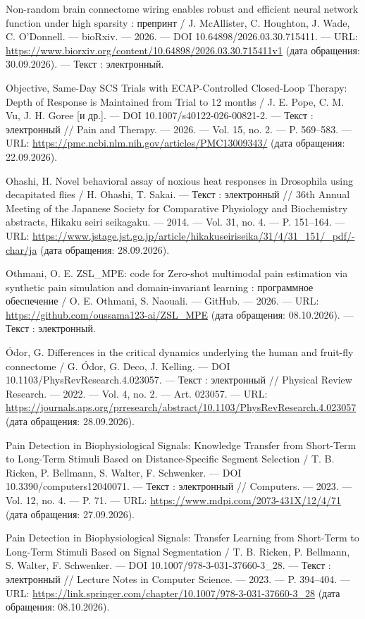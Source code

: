 \begin{list}{}{\setlength{\leftmargin}{10mm}\setlength{\labelwidth}{8mm}\setlength{\labelsep}{2mm}\setlength{\itemsep}{0pt}\setlength{\parsep}{0pt}\setlength{\topsep}{0pt}}
\item[213.] Non-random brain connectome wiring enables robust and efficient neural network function under high sparsity : препринт / J. McAllister, C. Houghton, J. Wade, C. O’Donnell. — bioRxiv. — 2026. — DOI 10.64898/2026.03.30.715411. — URL: \url{https://www.biorxiv.org/content/10.64898/2026.03.30.715411v1} (дата обращения: 30.09.2026). — Текст : электронный.
\item[214.] Objective, Same-Day SCS Trials with ECAP-Controlled Closed-Loop Therapy: Depth of Response is Maintained from Trial to 12 months / J. E. Pope, C. M. Vu, J. H. Goree [и др.]. — DOI 10.1007/s40122-026-00821-2. — Текст : электронный // Pain and Therapy. — 2026. — Vol. 15, no. 2. — P. 569–583. — URL: \url{https://pmc.ncbi.nlm.nih.gov/articles/PMC13009343/} (дата обращения: 22.09.2026).
\item[215.] Ohashi, H. Novel behavioral assay of noxious heat responses in Drosophila using decapitated flies / H. Ohashi, T. Sakai. — Текст : электронный // 36th Annual Meeting of the Japanese Society for Comparative Physiology and Biochemistry abstracts, Hikaku seiri seikagaku. — 2014. — Vol. 31, no. 4. — P. 151–164. — URL: \url{https://www.jstage.jst.go.jp/article/hikakuseiriseika/31/4/31\_151/\_pdf/-char/ja} (дата обращения: 28.09.2026).
\item[216.] Othmani, O. E. ZSL\_MPE: code for Zero-shot multimodal pain estimation via synthetic pain simulation and domain-invariant learning : программное обеспечение / O. E. Othmani, S. Naouali. — GitHub. — 2026. — URL: \url{https://github.com/oussama123-ai/ZSL\_MPE} (дата обращения: 08.10.2026). — Текст : электронный.
\item[217.] Ódor, G. Differences in the critical dynamics underlying the human and fruit-fly connectome / G. Ódor, G. Deco, J. Kelling. — DOI 10.1103/PhysRevResearch.4.023057. — Текст : электронный // Physical Review Research. — 2022. — Vol. 4, no. 2. — Art. 023057. — URL: \url{https://journals.aps.org/prresearch/abstract/10.1103/PhysRevResearch.4.023057} (дата обращения: 28.09.2026).
\item[218.] Pain Detection in Biophysiological Signals: Knowledge Transfer from Short-Term to Long-Term Stimuli Based on Distance-Specific Segment Selection / T. B. Ricken, P. Bellmann, S. Walter, F. Schwenker. — DOI 10.3390/computers12040071. — Текст : электронный // Computers. — 2023. — Vol. 12, no. 4. — P. 71. — URL: \url{https://www.mdpi.com/2073-431X/12/4/71} (дата обращения: 27.09.2026).
\item[219.] Pain Detection in Biophysiological Signals: Transfer Learning from Short-Term to Long-Term Stimuli Based on Signal Segmentation / T. B. Ricken, P. Bellmann, S. Walter, F. Schwenker. — DOI 10.1007/978-3-031-37660-3\_28. — Текст : электронный // Lecture Notes in Computer Science. — 2023. — P. 394–404. — URL: \url{https://link.springer.com/chapter/10.1007/978-3-031-37660-3\_28} (дата обращения: 08.10.2026).

\end{list}
